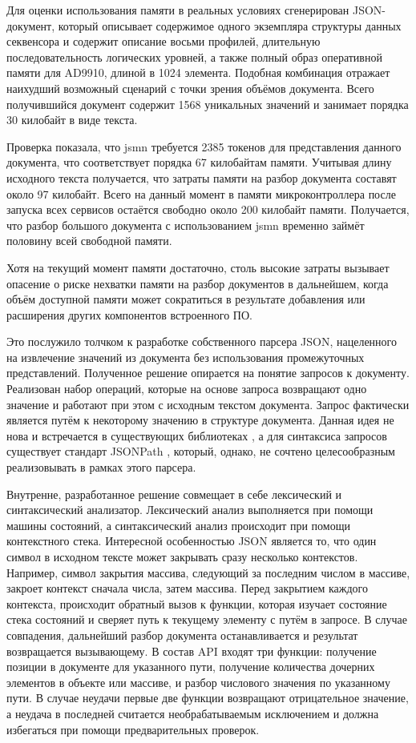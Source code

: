 \documentclass{report}
\begin{document}
Для оценки использования памяти в реальных условиях сгенерирован JSON-документ, который описывает содержимое одного экземпляра структуры данных секвенсора и содержит описание восьми профилей, длительную последовательность логических уровней, а также полный образ оперативной памяти для AD9910, длиной в 1024 элемента. Подобная комбинация отражает наихудший возможный сценарий с точки зрения объёмов документа. Всего получившийся документ содержит 1568 уникальных значений и занимает порядка 30 килобайт в виде текста.

Проверка показала, что jsmn требуется 2385 токенов для представления данного документа, что соответствует порядка 67 килобайтам памяти. Учитывая длину исходного текста получается, что затраты памяти на разбор документа составят около 97 килобайт. Всего на данный момент в памяти микроконтроллера после запуска всех сервисов остаётся свободно около 200 килобайт памяти. Получается, что разбор большого документа с использованием jsmn временно займёт половину всей свободной памяти.

Хотя на текущий момент памяти достаточно, столь высокие затраты вызывает опасение о риске нехватки памяти на разбор документов в дальнейшем, когда объём доступной памяти может сократиться в результате добавления или расширения других компонентов встроенного ПО.

Это послужило толчком к разработке собственного парсера JSON, нацеленного на извлечение значений из документа без использования промежуточных представлений. Полученное решение опирается на понятие запросов к документу. Реализован набор операций, которые на основе запроса возвращают одно значение и работают при этом с исходным текстом документа. Запрос фактически является путём к некоторому значению в структуре документа. Данная идея не нова и встречается в существующих библиотеках \cite{jread}, а для синтаксиса запросов существует стандарт JSONPath \cite{jsonpath}, который, однако, не сочтено целесообразным реализовывать в рамках этого парсера.

Внутренне, разработанное решение совмещает в себе лексический и синтаксический анализатор. Лексический анализ выполняется при помощи машины состояний, а синтаксический анализ происходит при помощи контекстного стека. Интересной особенностью JSON является то, что один символ в исходном тексте может закрывать сразу несколько контекстов. Например, символ закрытия массива, следующий за последним числом в массиве, закроет контекст сначала числа, затем массива. Перед закрытием каждого контекста, происходит обратный вызов к функции, которая изучает состояние стека состояний и сверяет путь к текущему элементу с путём в запросе. В случае совпадения, дальнейший разбор документа останавливается и результат возвращается вызывающему. В состав API входят три функции: получение позиции в документе для указанного пути, получение количества дочерних элементов в объекте или массиве, и разбор числового значения по указанному пути. В случае неудачи первые две функции возвращают отрицательное значение, а неудача в последней считается необрабатываемым исключением и должна избегаться при помощи предварительных проверок.
\end{document}
